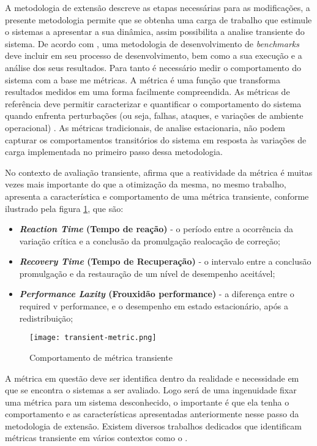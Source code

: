 A metodologia de extensão descreve as etapas necessárias para as modificações, a presente metodologia permite que se obtenha uma carga de trabalho que estimule o sistemas a apresentar a sua dinâmica, assim possibilita a analise transiente do sistema. De acordo com \cite{KaiSachs2010}, uma metodologia de desenvolvimento de \textit{benchmarks} deve incluir em seu processo de desenvolvimento, bem como a sua execução e a análise dos seus resultados. Para tanto é necessário medir o comportamento do sistema com a base me métricas. A métrica é uma função que transforma resultados medidos em uma forma facilmente compreendida. \cite{Folkerts2013} As métricas de referência deve permitir caracterizar e quantificar o comportamento do sistema quando enfrenta perturbações (ou seja, falhas, ataques, e variações de ambiente operacional) \cite{Marco2012}. As métricas tradicionais, de analise estacionaria, não podem capturar os comportamentos transitórios do sistema em resposta às variações de carga implementada no primeiro passo dessa metodologia.

No contexto de avaliação transiente, \cite{Rosu1997} afirma que a reatividade da métrica é muitas vezes mais importante do que a otimização da mesma, no mesmo trabalho, \cite{Rosu1997} apresenta a característica e comportamento de uma métrica transiente, conforme ilustrado pela figura \ref{fig:transient-metric}, que são: 
\begin{itemize}
	\item \textbf{\textit{Reaction Time} (Tempo de reação)} - o período entre a ocorrência da variação crítica e a conclusão da promulgação realocação de correção;
	
	\item \textbf{\textit{Recovery Time} (Tempo de Recuperação)}  - o intervalo entre a conclusão promulgação e da restauração de um nível de desempenho aceitável;
	
	\item \textbf{\textit{Performance Laxity} (Frouxidão performance)} - a diferença entre o required v performance, e o desempenho em estado estacionário, após a redistribuição;
\end{itemize}


\begin{figure}[!htb]
	\centering
	\texttt{[image: transient-metric.png]}
	\caption{Comportamento de métrica transiente}
	\label{fig:transient-metric}
\end{figure}


A métrica em questão deve ser identifica dentro da realidade e necessidade em que se encontra o sistemas a ser avaliado. Logo será de uma ingenuidade fixar uma métrica para um sistema desconhecido, o importante é que ela tenha o comportamento e as características apresentadas anteriormente nesse passo da metodologia de extensão. Existem diversos trabalhos dedicados que identificam métricas transiente em vários contextos como o \cite{Binnig2009, Lu2000, Rosu1997}.

